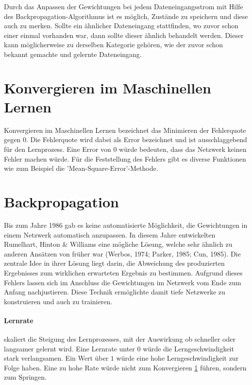 Durch das Anpassen der Gewichtungen bei jedem Dateneingangsstrom mit Hilfe des Backpropagation-Algorithmus ist es möglich, Zustände zu speichern und diese auch zu merken. 
Sollte ein ähnlicher Dateneingang stattfinden, wo zuvor schon einer einmal vorhanden war, dann sollte dieser ähnlich behandelt werden.
Dieser kann möglicherweise zu derselben Kategorie gehören, wie der zuvor schon bekannt gemachte und gelernte Dateneingang.

\section{Konvergieren im Maschinellen Lernen}
\label{sec:Konvergieren}

Konvergieren im Maschinellen Lernen bezeichnet das Minimieren der Fehlerquote gegen $0$.
Die Fehlerquote wird dabei als Error bezeichnet und ist ausschlaggebend für den Lernprozess.
Eine Error von $0$ würde bedeuten, dass das Netzwerk keinen Fehler machen würde.
Für die Feststellung des Fehlers gibt es diverse Funktionen wie zum Beispiel die 'Mean-Square-Error'-Methode.

\section{Backpropagation}
\label{sec:Backpropagation}

Bis zum Jahre 1986 gab es keine automatisierte Möglichkeit, die Gewichtungen in einem Netzwerk automatisch anzupassen.
In diesem Jahre entwickelten Rumelhart, Hinton \& Williams eine mögliche Lösung, welche sehr ähnlich zu anderen Ansätzen von früher war (Werbos, 1974; Parker, 1985; Cun, 1985).
Die zentrale Idee in ihrer Lösung liegt darin, die Abweichung des produzierten Ergebnisses zum wirklichen erwarteten Ergebnis zu bestimmen. 
Aufgrund dieses Fehlers lassen sich im Anschluss die Gewichtungen im Netzwerk vom Ende zum Anfang nachjustieren. 
Diese Technik ermöglichte damit tiefe Netzwerke zu konstruieren und auch zu trainieren.

\paragraph{Lernrate} skaliert die Steigung des Lernprozesses, mit der Auswirkung ob schneller oder langsamer gelernt wird.
Eine Lernrate unter $0$ würde die Lerngeschwindigkeit stark verlangsamen. 
Ein Wert über $1$ würde eine hohe Lerngeschwindigkeit zur Folge haben. 
Eine zu hohe Rate würde nicht zum Konvergieren \ref{sec:Konvergieren} führen, sondern zum Springen.


